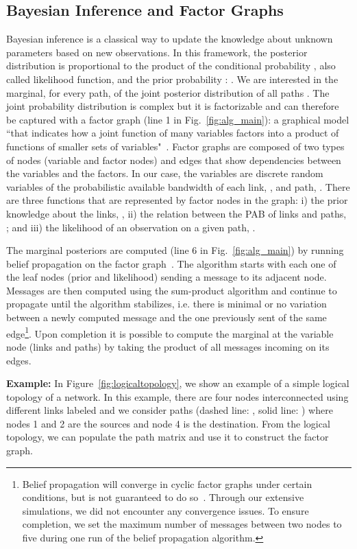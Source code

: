 \documentclass[final,5p,times,twocolumn]{elsarticle}
\begin{document}
\subsection{Bayesian Inference and Factor Graphs}
\label{ssec:bay_inf_fac_gra}

Bayesian inference is a classical way to update the knowledge about unknown parameters based on new observations.  
In this framework, the posterior distribution  is proportional to the product of the conditional probability , also called likelihood function, and the prior probability : .  We are interested in the marginal, for every path, of the joint posterior distribution of all paths .  
The joint probability distribution is complex but it is factorizable and can therefore be captured with a factor graph (line 1 in Fig.~\ref{fig:alg_main}): a graphical model ``that indicates how a joint function of many variables factors into a product of functions of smaller sets of variables"~\cite{fre:98}.  
Factor graphs are composed of two types of nodes (variable and factor nodes) and edges that show dependencies between the variables and the factors.
In our case, the variables are discrete random variables of the probabilistic available bandwidth of each link, , and path, .  There are three functions that are represented by factor nodes in the graph: i) the prior knowledge about the links, , ii) the relation between the PAB of links and paths, ; and iii) the likelihood of an observation on a given path, .

The marginal posteriors are computed (line 6 in Fig.~\ref{fig:alg_main}) by running belief propagation on the factor graph~\cite{pea:88}. The algorithm starts with each one of the leaf nodes (prior and likelihood) sending a message to its adjacent node.  Messages are then computed using the sum-product algorithm and continue to propagate until the algorithm stabilizes, i.e. there is minimal or no variation between a newly computed message and the one previously sent of the same edge\footnote{Belief propagation will converge in cyclic factor graphs under certain conditions, but is not guaranteed to do so~\cite{moo:07}.  Through our extensive simulations, we did not encounter any convergence issues.  To ensure completion, we set the maximum number of messages between two nodes to five during one run of the belief propagation algorithm.}.  Upon completion it is possible to compute the marginal at the variable node (links and paths) by taking the product of all messages incoming on its edges.

{\bf Example:} In Figure~\ref{fig:logicaltopology}, we show an example of a simple logical topology of a network.  In this example, there are four nodes interconnected using  different links labeled  and we consider  paths (dashed line: , solid line: ) where nodes 1 and 2 are the sources and node 4 is the destination.  From the logical topology, we can populate the path matrix  and use it to construct the factor graph.
\end{document}
